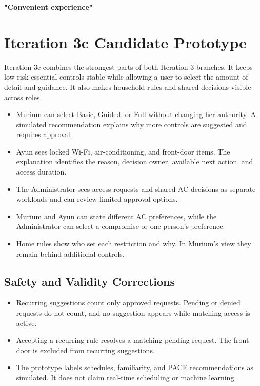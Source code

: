 \documentclass[11pt,letterpaper]{article}
\begin{document}
\begin{center}
  \large\bfseries "Convenient experience"
\end{center}

\section{Iteration 3c Candidate Prototype}

Iteration 3c combines the strongest parts of both Iteration 3 branches. It keeps low-risk
essential controls stable while allowing a user to select the amount of detail and guidance.
It also makes household rules and shared decisions visible across roles.

\begin{itemize}
  \item Murium can select Basic, Guided, or Full without changing her authority. A simulated recommendation explains why more controls are suggested and requires approval.
  \item Ayun sees locked Wi-Fi, air-conditioning, and front-door items. The explanation identifies the reason, decision owner, available next action, and access duration.
  \item The Administrator sees access requests and shared AC decisions as separate workloads and can review limited approval options.
  \item Murium and Ayun can state different AC preferences, while the Administrator can select a compromise or one person's preference.
  \item Home rules show who set each restriction and why. In Murium's view they remain behind additional controls.
\end{itemize}

\subsection{Safety and Validity Corrections}

\begin{itemize}
  \item Recurring suggestions count only approved requests. Pending or denied requests do not count, and no suggestion appears while matching access is active.
  \item Accepting a recurring rule resolves a matching pending request. The front door is excluded from recurring suggestions.
  \item The prototype labels schedules, familiarity, and PACE recommendations as simulated. It does not claim real-time scheduling or machine learning.
\end{itemize}
\end{document}
